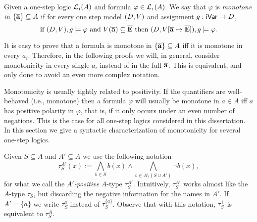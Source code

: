 
Given a one-step logic $\mathcal{L}_{\scriptscriptstyle 1}(A)$ and formula $\varphi \in \mathcal{L}_{\scriptscriptstyle 1}(A)$.
%
We say that $\varphi$ is \emph{monotone in $\{\overline{{\mathbf{a}}}\} \subseteq A$} if for every one step model $(D,V)$ and assignment $g:\mathsf{iVar}\to D$,
\[
\text{if } (D,\val),\ass \models \varphi \text{ and } \val(\vlist{a}) \subseteq \vlist{E} \text{ then } (D,\val[\vlist{a}\mapsto \vlist{E}]),\ass \models \varphi.
\]
%

\begin{remark}\label{rem:monotprodeach}
	It is easy to prove that a formula is monotone in $\{\overline{{\mathbf{a}}}\} \subseteq A$ iff it is monotone in every $a_i$. Therefore, in the following proofs we will, in general, consider monotonicity in every single $a_i$ instead of in the full $\overline{{\mathbf{a}}}$. This is equivalent, and only done to avoid an even more complex notation.
\end{remark}

Monotonicity is usually tightly related to positivity. If the quantifiers are well-behaved (i.e., monotone) then a formula $\varphi$ will usually be monotone in $a \in A$ iff $a$ has positive polarity in $\varphi$, that is, if it only occurs under an even number of negations. This is the case for all one-step logics considered in this dissertation. In this section we give a syntactic characterization of monotonicity for several one-step logics.

\begin{definition}
	Given $S \subseteq A$ and $A' \subseteq A$ we use the following notation
	\[
	\tau^{A'}_S(x) := \bigwedge_{b\in S} b(x) \land \bigwedge_{b\in A\setminus (S\cup A')}\lnot b(x) ,
	\]
	for what we call the \emph{$A'$-positive} $A$-type $\tau^{A'}_S$.
	Intuitively, $\tau^{A'}_S$ works almost like the $A$-type $\tau_S$, but discarding the negative information for the names in $A'$.
	If $A' = \{a\}$ we write $\tau^a_S$ instead of $\tau^{\{a\}}_S$. Observe that with this notation, $\tau^+_S$ is equivalent to $\tau^A_S$.
\end{definition}


